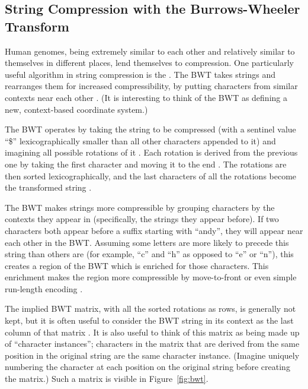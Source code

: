 \subsection{String Compression with the Burrows-Wheeler Transform}
\label{subsec:bwt}

Human genomes, being extremely similar to each other and relatively similar to themselves in different places, lend themselves to compression. One particularly useful algorithm in string compression is the . The BWT takes strings and rearranges them for increased compressibility, by putting characters from similar contexts near each other \cite{burrows1994block}. (It is interesting to think of the BWT as defining a new, context-based coordinate system.)

The BWT operates by taking the string to be compressed (with a sentinel value ``\$'' lexicographically smaller than all other characters appended to it) and imagining all possible rotations of it \cite{burrows1994block, ferragina2000opportunistic}. Each rotation is derived from the previous one by taking the first character and moving it to the end \cite{burrows1994block}. The rotations are then sorted lexicographically, and the last characters of all the rotations become the transformed string \cite{burrows1994block}.

The BWT makes strings more compressible by grouping characters by the contexts they appear in (specifically, the strings they appear before). If two characters both appear before a suffix starting with ``andy'', they will appear near each other in the BWT. Assuming some letters are more likely to precede this string than others are (for example, ``c'' and ``h'' as opposed to ``e'' or ``n''), this creates a region of the BWT which is enriched for those characters. This enrichment makes the region more compressible by move-to-front or even simple run-length encoding \cite{burrows1994block}.

The implied BWT matrix, with all the sorted rotations as rows, is generally not kept, but it is often useful to consider the BWT string in its context as the last column of that matrix \cite{burrows1994block, ferragina2000opportunistic}. It is also useful to think of this matrix as being made up of ``character instances''; characters in the matrix that are derived from the same position in the original string are the same character instance. (Imagine uniquely numbering the character at each position on the original string before creating the matrix.) Such a matrix is visible in Figure~\ref{fig:bwt}.

